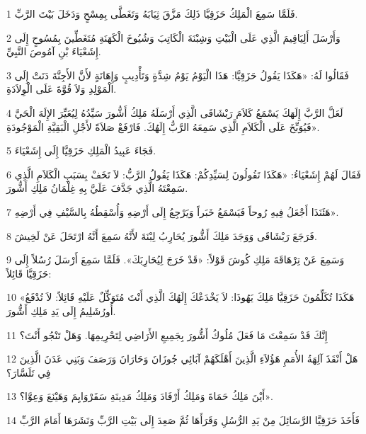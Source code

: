 \par 1 فَلَمَّا سَمِعَ الْمَلِكُ حَزَقِيَّا ذَلِكَ مَزَّقَ ثِيَابَهُ وَتَغَطَّى بِمِسْحٍ وَدَخَلَ بَيْتَ الرَّبِّ.
\par 2 وَأَرْسَلَ أَلِيَاقِيمَ الَّذِي عَلَى الْبَيْتِ وَشِبْنَةَ الْكَاتِبَ وَشُيُوخَ الْكَهَنَةِ مُتَغَطِّينَ بِمُسُوحٍ إِلَى إِشَعْيَاءَ بْنِ آمُوصَ النَّبِيِّ.
\par 3 فَقَالُوا لَهُ: «هَكَذَا يَقُولُ حَزَقِيَّا: هَذَا الْيَوْمُ يَوْمُ شِدَّةٍ وَتَأْدِيبٍ وَإِهَانَةٍ لأَنَّ الأَجِنَّةَ دَنَتْ إِلَى الْمَوْلِدِ وَلاَ قُوَّةَ عَلَى الْوِلاَدَةِ.
\par 4 لَعَلَّ الرَّبَّ إِلَهَكَ يَسْمَعُ كَلاَمَ رَبْشَاقَى الَّذِي أَرْسَلَهُ مَلِكُ أَشُّورَ سَيِّدُهُ لِيُعَيِّرَ الإِلَهَ الْحَيَّ فَيُوَبِّخَ عَلَى الْكَلاَمِ الَّذِي سَمِعَهُ الرَّبُّ إِلَهُكَ. فَارْفَعْ صَلاَةً لأَجْلِ الْبَقِيَّةِ الْمَوْجُودَةِ».
\par 5 فَجَاءَ عَبِيدُ الْمَلِكِ حَزَقِيَّا إِلَى إِشَعْيَاءَ.
\par 6 فَقَالَ لَهُمْ إِشَعْيَاءُ: «هَكَذَا تَقُولُونَ لِسَيِّدِكُمْ: هَكَذَا يَقُولُ الرَّبُّ: لاَ تَخَفْ بِسَبَبِ الْكَلاَمِ الَّذِي سَمِعْتَهُ الَّذِي جَدَّفَ عَلَيَّ بِهِ غِلْمَانُ مَلِكِ أَشُّورَ.
\par 7 هَئَنَذَا أَجْعَلُ فِيهِ رُوحاً فَيَسْمَعُ خَبَراً وَيَرْجِعُ إِلَى أَرْضِهِ وَأُسْقِطُهُ بِالسَّيْفِ فِي أَرْضِهِ».
\par 8 فَرَجَعَ رَبْشَاقَى وَوَجَدَ مَلِكَ أَشُّورَ يُحَارِبُ لِبْنَةَ لأَنَّهُ سَمِعَ أَنَّهُ ارْتَحَلَ عَنْ لَخِيشَ.
\par 9 وَسَمِعَ عَنْ تِرْهَاقَةَ مَلِكِ كُوشَ قَوْلاً: «قَدْ خَرَجَ لِيُحَارِبَكَ». فَلَمَّا سَمِعَ أَرْسَلَ رُسُلاً إِلَى حَزَقِيَّا قَائِلاً:
\par 10 «هَكَذَا تُكَلِّمُونَ حَزَقِيَّا مَلِكَ يَهُوذَا: لاَ يَخْدَعْكَ إِلَهُكَ الَّذِي أَنْتَ مُتَوَكِّلٌ عَلَيْهِ قَائِلاً: لاَ تُدْفَعُ أُورُشَلِيمُ إِلَى يَدِ مَلِكِ أَشُّورَ.
\par 11 إِنَّكَ قَدْ سَمِعْتَ مَا فَعَلَ مُلُوكُ أَشُّورَ بِجَمِيعِ الأَرَاضِي لِتَحْرِيمِهَا. وَهَلْ تَنْجُو أَنْتَ؟
\par 12 هَلْ أَنْقَذَ آلِهَةُ الأُمَمِ هَؤُلاَءِ الَّذِينَ أَهْلَكَهُمْ آبَائِي جُوزَانَ وَحَارَانَ وَرَصَفَ وَبَنِي عَدَنَ الَّذِينَ فِي تَلَسَّارَ؟
\par 13 أَيْنَ مَلِكُ حَمَاةَ وَمَلِكُ أَرْفَادَ وَمَلِكُ مَدِينَةِ سَفَرْوَايِمَ وَهَيْنَعَ وَعِوَّا؟».
\par 14 فَأَخَذَ حَزَقِيَّا الرَّسَائِلَ مِنْ يَدِ الرُّسُلِ وَقَرَأَهَا ثُمَّ صَعِدَ إِلَى بَيْتِ الرَّبِّ وَنَشَرَهَا أَمَامَ الرَّبِّ
